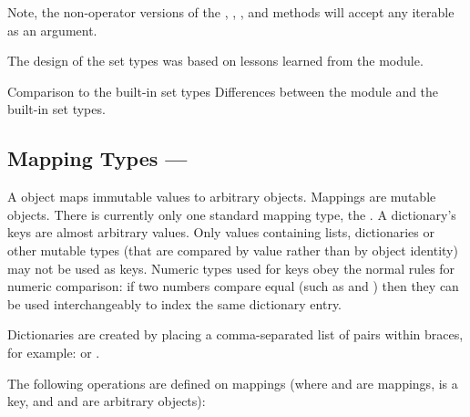 Note, the non-operator versions of the ,
, , and
 methods will accept any iterable
as an argument.

The design of the set types was based on lessons learned from the
 module.
     
\begin{seealso}     
          {Comparison to the built-in set types}
          {Differences between the  module and the
           built-in set types.}					      
\end{seealso}
     

\subsection{Mapping Types ---  \label{typesmapping}}

A  object maps  immutable values to
arbitrary objects.  Mappings are mutable objects.  There is currently
only one standard mapping type, the .  A dictionary's keys are
almost arbitrary values.  Only values containing lists, dictionaries
or other mutable types (that are compared by value rather than by
object identity) may not be used as keys.
Numeric types used for keys obey the normal rules for numeric
comparison: if two numbers compare equal (such as  and
) then they can be used interchangeably to index the same
dictionary entry.

Dictionaries are created by placing a comma-separated list of
 pairs within braces, for example:
 or
.

The following operations are defined on mappings (where  and
 are mappings,  is a key, and  and  are
arbitrary objects):

